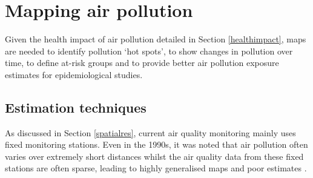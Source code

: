 \documentclass[11pt]{report}
\begin{document}


\section{Mapping air pollution} \label{mappingpollution}

Given the health impact of air pollution detailed in Section \ref{healthimpact}, maps are needed to identify pollution `hot spots', to show changes in pollution over time, to define at-risk groups and to provide better air pollution exposure estimates for epidemiological studies.

\subsection{Estimation techniques} \label{estimationtechniques}

As discussed in Section \ref{spatialres}, current air quality monitoring mainly uses fixed monitoring stations. Even in the 1990s, it was noted that air pollution often varies over extremely short distances whilst the air quality data from these fixed stations are often sparse, leading to highly generalised maps and poor estimates \citep{Briggs1997mappingGIS}.
\end{document}
